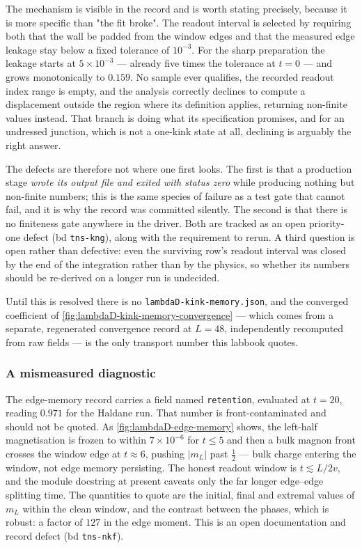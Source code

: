 The mechanism is visible in the record and is worth stating precisely, because
it is more specific than "the fit broke". The readout interval is selected by
requiring both that the wall be padded from the window edges and that the
measured edge leakage stay below a fixed tolerance of $10^{-3}$. For the sharp
preparation the leakage starts at $5\times10^{-3}$ --- already five times the
tolerance at $t=0$ --- and grows monotonically to $0.159$. No sample ever
qualifies, the recorded readout index range is empty, and the analysis
correctly declines to compute a displacement outside the region where its
definition applies, returning non-finite values instead. That branch is doing
what its specification promises, and for an undressed junction, which is not a
one-kink state at all, declining is arguably the right answer.

The defects are therefore not where one first looks. The first is that a
production stage \emph{wrote its output file and exited with status zero} while
producing nothing but non-finite numbers; this is the same species of failure
as a test gate that cannot fail, and it is why the record was committed
silently. The second is that there is no finiteness gate anywhere in the
driver. Both are tracked as an open priority-one defect (bd
\texttt{tns-kng}), along with the requirement to rerun. A third question is
open rather than defective: even the surviving row's readout interval was
closed by the end of the integration rather than by the physics, so whether
its numbers should be re-derived on a longer run is undecided.

Until this is resolved there is no \texttt{lambdaD-\allowbreak{}kink-\allowbreak{}memory.json}, and the
converged coefficient of \cref{fig:lambdaD-kink-memory-convergence} --- which
comes from a separate, regenerated convergence record at $L=48$, independently
recomputed from raw fields --- is the only transport number this labbook
quotes.

\subsubsection*{A mismeasured diagnostic}

The edge-memory record carries a field named \texttt{retention}, evaluated at
$t=20$, reading $0.971$ for the Haldane run. That number is
front-contaminated and should not be quoted. As \cref{fig:lambdaD-edge-memory}
shows, the left-half magnetisation is frozen to within $7\times10^{-6}$ for
$t\leq5$ and then a bulk magnon front crosses the window edge at $t\approx6$,
pushing $|m_L|$ past $\tfrac12$ --- bulk charge entering the window, not edge
memory persisting. The honest readout window is $t\lesssim L/2v$, and the
module docstring at present caveats only the far longer edge--edge splitting
time. The quantities to quote are the initial, final and extremal values of
$m_L$ within the clean window, and the contrast between the phases, which is
robust: a factor of $127$ in the edge moment. This is an open documentation
and record defect (bd \texttt{tns-nkf}).

